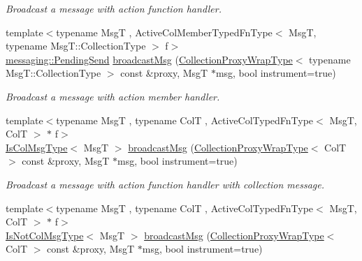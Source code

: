 \begin{DoxyCompactItemize}
\begin{DoxyCompactList}\small\item\em Broadcast a message with action function handler. \end{DoxyCompactList}\item 
{\footnotesize template$<$typename MsgT , Active\+Col\+Member\+Typed\+Fn\+Type$<$ Msg\+T, typename Msg\+T\+::\+Collection\+Type $>$ f$>$ }\\\hyperlink{structvt_1_1messaging_1_1_pending_send}{messaging\+::\+Pending\+Send} \hyperlink{structvt_1_1vrt_1_1collection_1_1_collection_manager_a9cadcebd1d7c26512091f9624a23a02c}{broadcast\+Msg} (\hyperlink{structvt_1_1vrt_1_1collection_1_1_collection_manager_a56458ed7f9bb22b631b9b3a745f42f94}{Collection\+Proxy\+Wrap\+Type}$<$ typename Msg\+T\+::\+Collection\+Type $>$ const \&proxy, MsgT $\ast$msg, bool instrument=true)
\begin{DoxyCompactList}\small\item\em Broadcast a message with action member handler. \end{DoxyCompactList}\item 
{\footnotesize template$<$typename MsgT , typename ColT , Active\+Col\+Typed\+Fn\+Type$<$ Msg\+T, Col\+T $>$ $\ast$ f$>$ }\\\hyperlink{structvt_1_1vrt_1_1collection_1_1_collection_manager_a21c21612c806016788057aeab142af20}{Is\+Col\+Msg\+Type}$<$ MsgT $>$ \hyperlink{structvt_1_1vrt_1_1collection_1_1_collection_manager_a2ea2ea93c25a438f0b9b6af390ef0881}{broadcast\+Msg} (\hyperlink{structvt_1_1vrt_1_1collection_1_1_collection_manager_a56458ed7f9bb22b631b9b3a745f42f94}{Collection\+Proxy\+Wrap\+Type}$<$ ColT $>$ const \&proxy, MsgT $\ast$msg, bool instrument=true)
\begin{DoxyCompactList}\small\item\em Broadcast a message with action function handler with collection message. \end{DoxyCompactList}\item 
{\footnotesize template$<$typename MsgT , typename ColT , Active\+Col\+Typed\+Fn\+Type$<$ Msg\+T, Col\+T $>$ $\ast$ f$>$ }\\\hyperlink{structvt_1_1vrt_1_1collection_1_1_collection_manager_ae376deeefd4f89a0b1c93849977715d9}{Is\+Not\+Col\+Msg\+Type}$<$ MsgT $>$ \hyperlink{structvt_1_1vrt_1_1collection_1_1_collection_manager_a0aa73c7acf95f668330d9c31ce12b581}{broadcast\+Msg} (\hyperlink{structvt_1_1vrt_1_1collection_1_1_collection_manager_a56458ed7f9bb22b631b9b3a745f42f94}{Collection\+Proxy\+Wrap\+Type}$<$ ColT $>$ const \&proxy, MsgT $\ast$msg, bool instrument=true)

\end{DoxyCompactItemize}
